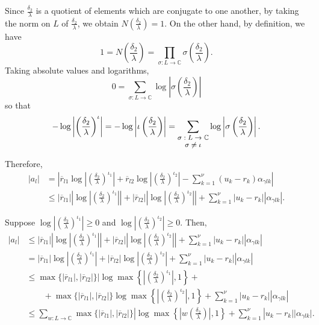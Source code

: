 Since $\frac{\delta_2}{\lambda}$ is a quotient of elements which are conjugate to one another, by taking the norm on $L$ of $\frac{\delta_2}{\lambda}$, we obtain $N\left(\frac{\delta_2}{\lambda}\right) = 1.$ On the other hand, by definition, we have 
\[1 = N\left(\frac{\delta_2}{\lambda}\right) = \prod_{\sigma: L \to \mathbb{C}} \sigma \left(\frac{\delta_2}{\lambda}\right).\]
Taking absolute values and logarithms, 
\[0 = \sum_{\sigma: L \to \mathbb{C}} \log\left|\sigma \left(\frac{\delta_2}{\lambda}\right)\right|\]
so that
\[-\log\left|\left(\frac{\delta_2}{\lambda}\right)^{\iota}\right| = -\log\left|\iota \left(\frac{\delta_2}{\lambda}\right)\right| = \sum_{\shortstack{\footnotesize $\sigma: L \to \mathbb{C} $\\ \footnotesize $ \sigma \neq \iota$}} \log\left|\sigma \left(\frac{\delta_2}{\lambda}\right)\right|.\]

Therefore,
\begin{align*}
|a_l| 	& = \left|\overline{r}_{l1}\log\left|\left(\frac{\delta_2}{\lambda}\right)^{\iota_1}\right| + \overline{r}_{l2}\log\left|\left(\frac{\delta_2}{\lambda}\right)^{\iota_2}\right| - \sum_{k=1}^{\nu}(u_k-r_k)\alpha_{\gamma l k}\right|\\
	& \leq |\overline{r}_{l1}|\left|\log\left|\left(\frac{\delta_2}{\lambda}\right)^{\iota_1}\right|\right| + |\overline{r}_{l2}|\left|\log\left|\left(\frac{\delta_2}{\lambda}\right)^{\iota_2}\right|\right| + \sum_{k=1}^{\nu}|u_k-r_k||\alpha_{\gamma l k}|.
\end{align*}

Suppose $\log\left|\left(\frac{\delta_2}{\lambda}\right)^{\iota_1}\right| \geq 0$ and $\log\left|\left(\frac{\delta_2}{\lambda}\right)^{\iota_2}\right| \geq 0$. Then, 
\begin{align*}
|a_l| 	& \leq |\overline{r}_{l1}|\left|\log\left|\left(\frac{\delta_2}{\lambda}\right)^{\iota_1}\right|\right| + |\overline{r}_{l2}|\left|\log\left|\left(\frac{\delta_2}{\lambda}\right)^{\iota_2}\right|\right| + \sum_{k=1}^{\nu}|u_k-r_k||\alpha_{\gamma l k}|\\
	& = |\overline{r}_{l1}|\log\left|\left(\frac{\delta_2}{\lambda}\right)^{\iota_1}\right| + |\overline{r}_{l2}|\log\left|\left(\frac{\delta_2}{\lambda}\right)^{\iota_2}\right| + \sum_{k=1}^{\nu}|u_k-r_k||\alpha_{\gamma l k}|\\
	& \leq \max\{|\overline{r}_{l1}|, |\overline{r}_{l2}|\}|\log\max\left\{\left|\left(\frac{\delta_2}{\lambda}\right)^{\iota_1}\right|,1\right\} + \\
	& \quad \quad +\max\{|\overline{r}_{l1}|, |\overline{r}_{l2}|\}\log\max\left\{\left|\left(\frac{\delta_2}{\lambda}\right)^{\iota_2}\right|,1\right\} + \sum_{k=1}^{\nu}|u_k-r_k||\alpha_{\gamma l k}|\\
	&  \leq \sum_{w: L \to \mathbb{C}}\max\{|\overline{r}_{l1}|, |\overline{r}_{l2}|\}|\log\max\left\{\left|w\left(\frac{\delta_2}{\lambda}\right)\right|,1\right\} + \sum_{k=1}^{\nu}|u_k-r_k||\alpha_{\gamma l k}|.
\end{align*}

